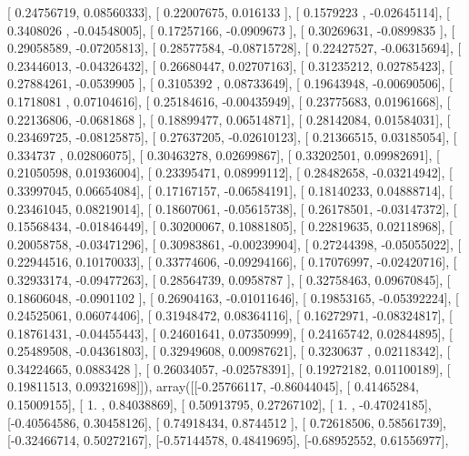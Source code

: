 \documentclass{article}
\begin{document}
       [ 0.24756719,  0.08560333],
       [ 0.22007675,  0.016133  ],
       [ 0.1579223 , -0.02645114],
       [ 0.3408026 , -0.04548005],
       [ 0.17257166, -0.0909673 ],
       [ 0.30269631, -0.0899835 ],
       [ 0.29058589, -0.07205813],
       [ 0.28577584, -0.08715728],
       [ 0.22427527, -0.06315694],
       [ 0.23446013, -0.04326432],
       [ 0.26680447,  0.02707163],
       [ 0.31235212,  0.02785423],
       [ 0.27884261, -0.0539905 ],
       [ 0.3105392 ,  0.08733649],
       [ 0.19643948, -0.00690506],
       [ 0.1718081 ,  0.07104616],
       [ 0.25184616, -0.00435949],
       [ 0.23775683,  0.01961668],
       [ 0.22136806, -0.0681868 ],
       [ 0.18899477,  0.06514871],
       [ 0.28142084,  0.01584031],
       [ 0.23469725, -0.08125875],
       [ 0.27637205, -0.02610123],
       [ 0.21366515,  0.03185054],
       [ 0.334737  ,  0.02806075],
       [ 0.30463278,  0.02699867],
       [ 0.33202501,  0.09982691],
       [ 0.21050598,  0.01936004],
       [ 0.23395471,  0.08999112],
       [ 0.28482658, -0.03214942],
       [ 0.33997045,  0.06654084],
       [ 0.17167157, -0.06584191],
       [ 0.18140233,  0.04888714],
       [ 0.23461045,  0.08219014],
       [ 0.18607061, -0.05615738],
       [ 0.26178501, -0.03147372],
       [ 0.15568434, -0.01846449],
       [ 0.30200067,  0.10881805],
       [ 0.22819635,  0.02118968],
       [ 0.20058758, -0.03471296],
       [ 0.30983861, -0.00239904],
       [ 0.27244398, -0.05055022],
       [ 0.22944516,  0.10170033],
       [ 0.33774606, -0.09294166],
       [ 0.17076997, -0.02420716],
       [ 0.32933174, -0.09477263],
       [ 0.28564739,  0.0958787 ],
       [ 0.32758463,  0.09670845],
       [ 0.18606048, -0.0901102 ],
       [ 0.26904163, -0.01011646],
       [ 0.19853165, -0.05392224],
       [ 0.24525061,  0.06074406],
       [ 0.31948472,  0.08364116],
       [ 0.16272971, -0.08324817],
       [ 0.18761431, -0.04455443],
       [ 0.24601641,  0.07350999],
       [ 0.24165742,  0.02844895],
       [ 0.25489508, -0.04361803],
       [ 0.32949608,  0.00987621],
       [ 0.3230637 ,  0.02118342],
       [ 0.34224665,  0.0883428 ],
       [ 0.26034057, -0.02578391],
       [ 0.19272182,  0.01100189],
       [ 0.19811513,  0.09321698]]), array([[-0.25766117, -0.86044045],
       [ 0.41465284,  0.15009155],
       [ 1.        ,  0.84038869],
       [ 0.50913795,  0.27267102],
       [ 1.        , -0.47024185],
       [-0.40564586,  0.30458126],
       [ 0.74918434,  0.8744512 ],
       [ 0.72618506,  0.58561739],
       [-0.32466714,  0.50272167],
       [-0.57144578,  0.48419695],
       [-0.68952552,  0.61556977],
\end{document}
